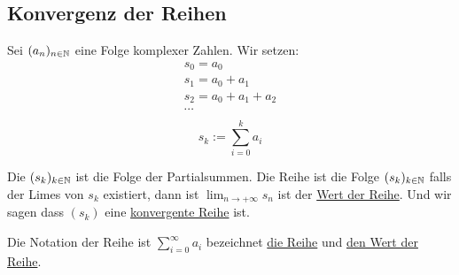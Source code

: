 \subsection{Konvergenz der Reihen}
\begin{Def}
  Sei $(a_n)_{n\in\mathbb{N}}$ eine Folge komplexer Zahlen. Wir setzen:
  \begin{align*}
    s_0=a_0\\
    s_1=a_0+a_1\\
    s_2=a_0+a_1+a_2\\
    \cdots\\
  \end{align*}
  \begin{equation*}
    s_k:=\sum^k_{i=0}a_i
  \end{equation*}
\end{Def}
\begin{Def}
  Die $(s_k)_{k\in\mathbb{N}}$ ist die Folge der Partialsummen. Die Reihe ist die Folge $(s_k)_{k\in\mathbb{N}}$ falls der Limes von $s_k$ existiert, dann ist $\lim_{n\to+\infty}s_n$ ist der \ul{Wert der Reihe}. Und wir sagen dass $(s_k)$ eine \ul{konvergente Reihe} ist.
\end{Def}
\begin{Not}
  Die Notation der Reihe ist $\sum^\infty_{i=0}a_i$ bezeichnet \ul{die Reihe} und \ul{den Wert der Reihe}.
\end{Not}
